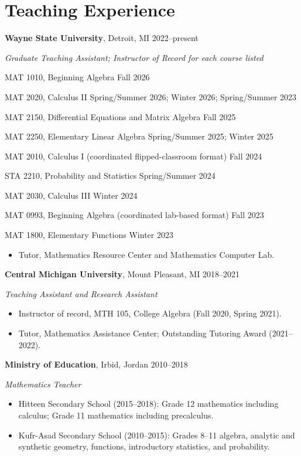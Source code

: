 \documentclass[11pt]{article}
\newcommand{\entry}[2]{\noindent #1 \hfill #2\par}
\newcommand{\course}[2]{\noindent\hspace*{1.2em}#1 \hfill #2\par}
\begin{document}
\section{Teaching Experience}
\entry{\textbf{Wayne State University}, Detroit, MI}{2022--present}
\textit{Graduate Teaching Assistant; Instructor of Record for each course listed}\par
\smallskip
\course{MAT 1010, Beginning Algebra}{Fall 2026}
\course{MAT 2020, Calculus II}{Spring/Summer 2026; Winter 2026; Spring/Summer 2023}
\course{MAT 2150, Differential Equations and Matrix Algebra
  }{Fall 2025}
\course{MAT 2250, Elementary Linear Algebra}{Spring/Summer 2025; Winter 2025}
\course{MAT 2010, Calculus I (coordinated flipped-classroom format)}{Fall 2024}
\course{STA 2210, Probability and Statistics}{Spring/Summer 2024}
\course{MAT 2030, Calculus III}{Winter 2024}
\course{MAT 0993, Beginning Algebra (coordinated lab-based format)}{Fall 2023}
\course{MAT 1800, Elementary Functions}{Winter 2023}
\smallskip
\begin{itemize}
  \item Tutor, Mathematics Resource Center and Mathematics Computer Lab.
\end{itemize}

\medskip
\entry{\textbf{Central Michigan University}, Mount Pleasant, MI}{2018--2021}
\textit{Teaching Assistant and Research Assistant}
\begin{itemize}
  \item Instructor of record, MTH 105, College Algebra (Fall 2020, Spring 2021).
  \item Tutor, Mathematics Assistance Center; Outstanding Tutoring Award (2021--2022).
\end{itemize}

\medskip
\entry{\textbf{Ministry of Education}, Irbid, Jordan}{2010--2018}
\textit{Mathematics Teacher}
\begin{itemize}
  \item Hitteen Secondary School (2015--2018): Grade 12 mathematics including calculus;
        Grade 11 mathematics including precalculus.
  \item Kufr-Asad Secondary School (2010--2015): Grades 8--11 algebra, analytic and synthetic geometry,
        functions, introductory statistics, and probability.
\end{itemize}
\end{document}

